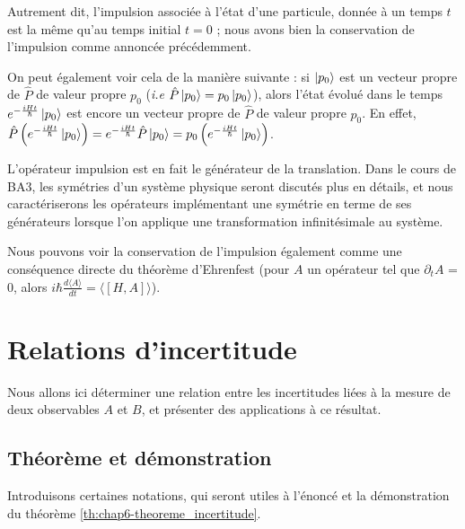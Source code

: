 \documentclass[../notesdecours]{subfiles}
\begin{document}
Autrement dit, l'impulsion associée à l'état d'une particule, donnée à un temps $t$ est la même qu'au temps initial $t=0$ ; nous avons bien la conservation de l'impulsion comme annoncée précédemment. \\

\begin{remark}
    On peut également voir cela de la manière suivante : si $\ket{p_0}$ est un vecteur propre de $\hat{P}$ de valeur propre $p_0$ (\textit{i.e} $\hat{P}\ket{p_0} = p_0 \ket{p_0}$), alors l'état évolué dans le temps $e^{-\frac{iHt}{\hbar}} \ket{p_0}$ est encore un vecteur propre de $\hat{P}$ de valeur propre $p_0$. En effet, $\hat{P} \left( e^{-\frac{iHt}{\hbar}} \ket{p_0} \right) = e^{-\frac{iHt}{\hbar}} \hat{P} \ket{p_0} = p_0 \left( e^{-\frac{iHt}{\hbar}} \ket{p_0} \right)$. 
\end{remark}

\begin{remark}
    L'opérateur impulsion est en fait le générateur de la translation. Dans le cours de BA3, les symétries d'un système physique seront discutés plus en détails, et nous caractériserons les opérateurs implémentant une symétrie en terme de ses générateurs lorsque l'on applique une transformation infinitésimale au système. 
\end{remark}

\begin{remark}
    Nous pouvons voir la conservation de l'impulsion également comme une conséquence directe du théorème d'Ehrenfest (pour $A$ un opérateur tel que $\partial_t A$ = 0, alors $i\hbar \frac{d\langle A \rangle}{dt} = \langle [H,A] \rangle$).
\end{remark}

\section{Relations d'incertitude}

Nous allons ici déterminer une relation entre les incertitudes liées à la mesure de deux observables $A$ et $B$, et présenter des applications à ce résultat. \\

\subsection{Théorème et démonstration}
Introduisons certaines notations, qui seront utiles à l'énoncé et la démonstration du théorème \ref{th:chap6-theoreme_incertitude}.
\end{document}
